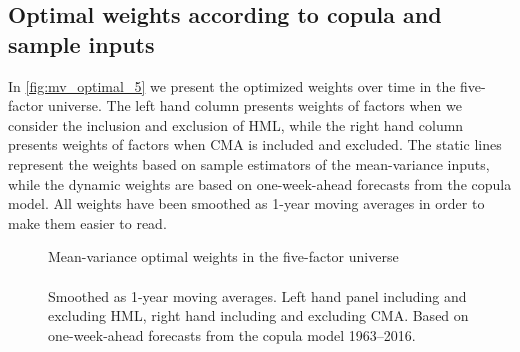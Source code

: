 \subsection{Optimal weights according to copula and sample inputs}
In \autoref{fig:mv_optimal_5} we present the optimized weights over time in the five-factor universe. The left hand column presents weights of factors when we consider the inclusion and exclusion of HML, while the right hand column presents weights of factors when CMA is included and excluded. The static lines represent the weights based on sample estimators of the mean-variance inputs, while the dynamic weights are based on one-week-ahead forecasts from the copula model. All weights have been smoothed as 1-year moving averages in order to make them easier to read. 

\begin{figure}[htbp]
  \centering
  \footnotesize
  \renewcommand{\arraystretch}{1.2}
  \caption{Mean-variance optimal weights in the five-factor universe \\ \quad \\ Smoothed as 1-year moving averages. Left hand panel including and excluding HML, right hand including and excluding CMA. Based on one-week-ahead forecasts from the copula model 1963--2016.}
  \label{fig:mv_optimal_5}
  

\end{figure}
